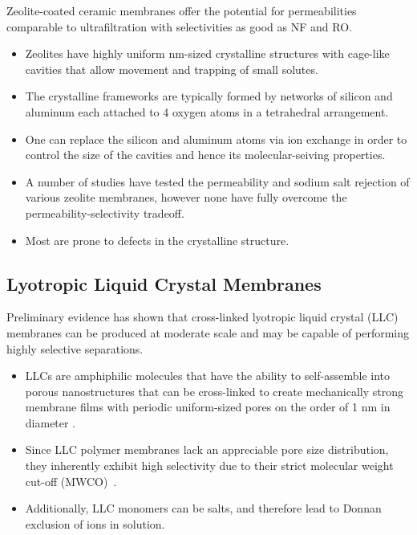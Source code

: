 \documentclass{article}
\begin{document}
  Zeolite-coated ceramic membranes offer the potential for permeabilities
  comparable to ultrafiltration with selectivities as good as NF and RO. 
  \begin{itemize}
    \item Zeolites have highly uniform nm-sized crystalline structures with
    cage-like cavities that allow movement and trapping of small solutes. 
    \item The crystalline frameworks are typically formed by networks of silicon
    and aluminum each attached to 4 oxygen atoms in a tetrahedral arrangement. 
    \item One can replace the silicon and aluminum atoms via ion exchange 
    in order to control the size of the cavities and hence its molecular-seiving properties.
    \item A number of studies have tested the permeability and sodium salt
    rejection of various zeolite membranes, however none have fully
    overcome the permeability-selectivity tradeoff.
    \item Most are prone to defects in the crystalline structure.\cite{pendergast_review_2011}
  \end{itemize}

  \subsection*{Lyotropic Liquid Crystal Membranes}
  
  Preliminary evidence has shown that cross-linked lyotropic liquid crystal
  (LLC) membranes can be produced at moderate scale and may be capable of 
  performing highly selective separations. 
  \begin{itemize}  
    \item LLCs are amphiphilic molecules that have the ability to self-assemble
    into porous nanostructures\cite{smith_ordered_1997} that
    can be cross-linked to create mechanically strong membrane films with 
    periodic uniform-sized pores on the order of 1 nm in diameter \cite{zhou_supported_2005}. 
    \item Since LLC polymer membranes lack an appreciable pore size distribution,
    they inherently exhibit high selectivity due to their strict molecular weight
    cut-off (MWCO)~\cite{zhou_supported_2005}. 
    \item Additionally, LLC monomers can be salts, and therefore lead to Donnan
    exclusion of ions in solution.\cite{donnan_theory_1995}
  \end{itemize}
\end{document}
